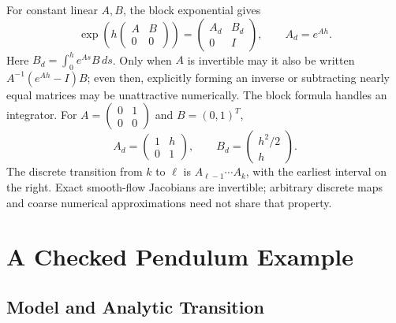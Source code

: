 For constant linear $A,B$, the block exponential gives
\begin{equation}
\exp\left(h\begin{pmatrix}A&B\\0&0\end{pmatrix}\right)
=\begin{pmatrix}A_d&B_d\\0&I\end{pmatrix},
\qquad A_d=e^{Ah}.
\label{eq:ch2:AB-discrete-formula}
\end{equation}
Here $B_d=\int_0^h e^{As}B\,ds$. Only when $A$ is invertible may it also be written $A^{-1}(e^{Ah}-I)B$; even then, explicitly forming an inverse or subtracting nearly equal matrices may be unattractive numerically. The block formula handles an integrator. For $A=\begin{pmatrix}0&1\\0&0\end{pmatrix}$ and $B=(0,1)^T$,
\begin{equation}
A_d=\begin{pmatrix}1&h\\0&1\end{pmatrix},\qquad
B_d=\begin{pmatrix}h^2/2\\h\end{pmatrix}.
\end{equation}
The discrete transition from $k$ to $\ell$ is $A_{\ell-1}\cdots A_k$, with the earliest interval on the right. Exact smooth-flow Jacobians are invertible; arbitrary discrete maps and coarse numerical approximations need not share that property.

\section{A Checked Pendulum Example}
\label{sec:ch2:pendulum-example}

\subsection{Model and Analytic Transition}

